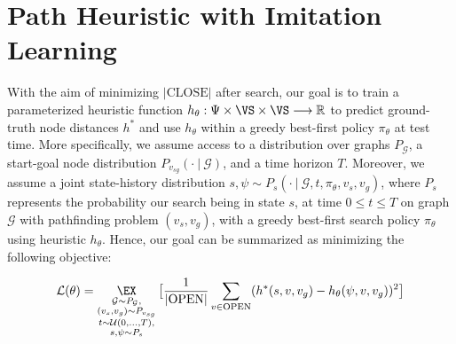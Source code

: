 \section{Path Heuristic with Imitation Learning}
\label{sec:approach}


 With the aim of minimizing $|\text{CLOSE}|$ after search, our goal is to train a parameterized heuristic function $h_{\theta} : \Psi \times \VS \times \VS \longrightarrow \mathbb{R}$ to predict ground-truth node distances $h^{*}$ and use $h_\theta$ within a greedy best-first policy $\pi_\theta$ at test time.  More specifically, we assume access to a distribution over graphs $P_{\mathcal{G}}$, a start-goal node distribution $P_{v_{sg}}(\cdot \: | \: \mathcal{G})$, and a time horizon $T$. Moreover, we assume a joint state-history distribution $s, \psi \sim P_s(\cdot \: | \: \mathcal{G}, t, \pi_{\theta}, v_s, v_g)$, where $P_s$ represents the probability our search being in state $s$, at time $0 \leq t \leq T$ on graph $\mathcal{G}$ with pathfinding problem $(v_s, v_g)$, with a greedy best-first search policy $\pi_{\theta}$ using heuristic $h_{\theta}$. Hence, our goal can be summarized as minimizing the following objective:

\begin{equation}
    \label{eq:obj}
    \mathcal{L}(\theta) = \mathop{\EX}_{\substack{\mathcal{G} \sim P_{\mathcal{G}}, \\ (v_s, v_g) \sim P_{v_{sg}} \\ t \sim \mathcal{U}(0, ..., T), \\ s, \psi \sim P_s}}\big[\frac{1}{|\text{OPEN}|}\sum_{v \in \text{OPEN}} (h^{*}(s, v, v_g) - h_{\theta}(\psi, v, v_g))^{2} \big]
\end{equation}


